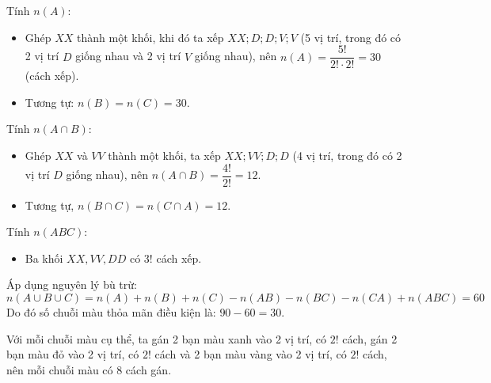 \documentclass[12pt, a4paper]{article}
\begin{document}
	\noindent Tính $n(A)$:
	\begin{itemize}[leftmargin=*]
		\item Ghép $XX$ thành một khối, khi đó ta xếp $XX; D; D; V; V$ (5 vị trí, trong đó có 2 vị trí $D$ giống nhau và 2 vị trí $V$ giống nhau), nên $n(A) = \dfrac{5!}{2! \cdot 2!} = 30$ (cách xếp).
		\item Tương tự: $n(B) = n(C) = 30$.
	\end{itemize}
	
	\noindent Tính $n(A \cap B)$:
	\begin{itemize}[leftmargin=*]
		\item Ghép $XX$ và $VV$ thành một khối, ta xếp $XX; VV; D; D$ (4 vị trí, trong đó có 2 vị trí $D$ giống nhau), nên $n(A \cap B) = \dfrac{4!}{2!} = 12$.
		\item Tương tự, $n(B \cap C) = n(C \cap A) = 12$.
	\end{itemize}
	
	\noindent Tính $n(ABC)$:
	\begin{itemize}[leftmargin=*]
		\item Ba khối $XX, VV, DD$ có $3!$ cách xếp.
	\end{itemize}
	
	\noindent Áp dụng nguyên lý bù trừ:
	\[
	n(A \cup B \cup C) = n(A) + n(B) + n(C) - n(AB) - n(BC) - n(CA) + n(ABC) = 60
	\]
	Do đó số chuỗi màu thỏa mãn điều kiện là: $90 - 60 = 30$.
	
	\noindent Với mỗi chuỗi màu cụ thể, ta gán 2 bạn màu xanh vào 2 vị trí, có $2!$ cách, gán 2 bạn màu đỏ vào 2 vị trí, có $2!$ cách và 2 bạn màu vàng vào 2 vị trí, có $2!$ cách, nên mỗi chuỗi màu có 8 cách gán.
	
\end{document}
